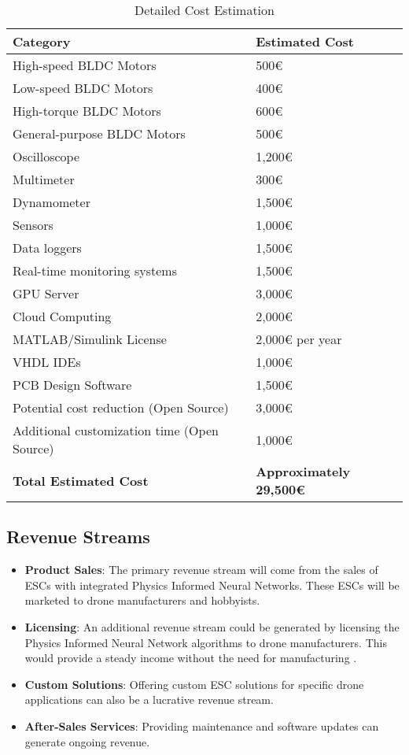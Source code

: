 \documentclass[12pt]{article}
\begin{document}
		\begin{table}[h]
			\centering
			\begin{tabular}{|l|l|}
				\hline
				\textbf{Category} & \textbf{Estimated Cost} \\
				\hline
				High-speed BLDC Motors & 500€ \\
				Low-speed BLDC Motors & 400€ \\
				High-torque BLDC Motors & 600€ \\
				General-purpose BLDC Motors & 500€ \\
				\hline
				Oscilloscope & 1,200€ \\
				Multimeter & 300€ \\
				Dynamometer & 1,500€ \\
				\hline
				Sensors & 1,000€ \\
				Data loggers & 1,500€ \\
				Real-time monitoring systems & 1,500€ \\
				\hline
				GPU Server & 3,000€ \\
				Cloud Computing & 2,000€ \\
				\hline
				MATLAB/Simulink License & 2,000€ per year \\
				VHDL IDEs & 1,000€ \\
				PCB Design Software & 1,500€ \\
				\hline
				Potential cost reduction (Open Source) & 3,000€ \\
				Additional customization time (Open Source) & 1,000€ \\
				\hline
				\textbf{Total Estimated Cost} & \textbf{Approximately 29,500€} \\
				\hline
			\end{tabular}
			\caption{Detailed Cost Estimation}
		\end{table}
		
			
		\subsection{Revenue Streams}
			\begin{itemize}
				\item \textbf{Product Sales}: The primary revenue stream will come from the sales of ESCs with integrated Physics Informed Neural Networks. These ESCs will be marketed to drone manufacturers and hobbyists.
				\item \textbf{Licensing}: An additional revenue stream could be generated by licensing the Physics Informed Neural Network algorithms to drone manufacturers. This would provide a steady income without the need for manufacturing \cite{revenue-streams}.
				\item \textbf{Custom Solutions}: Offering custom ESC solutions for specific drone applications can also be a lucrative revenue stream.
				\item \textbf{After-Sales Services}: Providing maintenance and software updates can generate ongoing revenue.
			\end{itemize}
			
\end{document}
